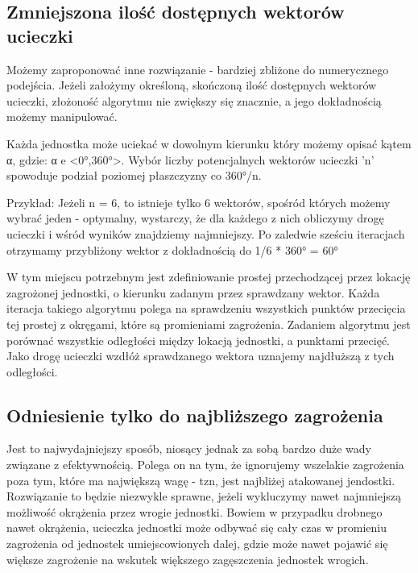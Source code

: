 \documentclass[12pt]{report}
\begin{document}
\subsection{Zmniejszona ilość dostępnych wektorów ucieczki}
Możemy zaproponować inne rozwiązanie - bardziej zbliżone do numerycznego podejścia. Jeżeli założymy określoną, skończoną ilość dostępnych wektorów ucieczki, złożoność algorytmu nie zwiększy się znacznie, a jego dokładnością możemy manipulować. 

Każda jednostka może uciekać w dowolnym kierunku który możemy opisać kątem α, gdzie:
α e <0°,360°>.
Wybór liczby potencjalnych wektorów ucieczki 'n' spowoduje podział poziomej płaszczyzny co 360°/n.

Przykład:
Jeżeli n = 6, to istnieje tylko 6 wektorów, spośród których możemy wybrać jeden - optymalny, wystarczy, że dla każdego z nich obliczymy drogę ucieczki i wśród wyników znajdziemy najmniejszy. Po zaledwie sześciu iteracjach otrzymamy przybliżony wektor z dokładnością do 1/6 * 360° = 60°

W tym miejscu potrzebnym jest zdefiniowanie prostej przechodzącej przez lokację zagrożonej jednostki, o kierunku zadanym przez sprawdzany wektor. Każda iteracja takiego algorytmu polega na sprawdzeniu wszystkich punktów przecięcia tej prostej z okręgami, które są promieniami zagrożenia. Zadaniem algorytmu jest porównać wszystkie odległości między lokacją jednostki, a punktami przecięć. Jako drogę ucieczki wzdłóż sprawdzanego wektora uznajemy najdłuższą z tych odległości.

\subsection{Odniesienie tylko do najbliższego zagrożenia}
Jest to najwydajniejszy sposób, niosący jednak za sobą bardzo duże wady związane z efektywnością. Polega on na tym, że ignorujemy wszelakie zagrożenia poza tym, które ma największą wagę - tzn, jest najbliżej atakowanej jendostki. Rozwiązanie to będzie niezwykle sprawne, jeżeli wykluczymy nawet najmniejszą możliwość okrążenia przez wrogie jednostki. Bowiem w przypadku drobnego nawet okrążenia, ucieczka jednostki może odbywać się cały czas w promieniu zagrożenia od jednostek umiejscowionych dalej, gdzie może nawet pojawić się większe zagrożenie na wskutek większego zagęszczenia jednostek wrogich.
\end{document}
